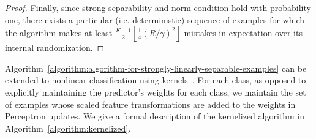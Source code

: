 \begin{proof}


Finally, since strong separability and norm condition hold with probability one,
there exists a particular (i.e. deterministic) sequence of examples for which
the algorithm makes at least $\frac{K-1}2 \left\lfloor \frac 1 4 (R/\gamma)^2
\right\rfloor$ mistakes in expectation over its internal randomization.
\end{proof}

Algorithm~\ref{algorithm:algorithm-for-strongly-linearly-separable-examples} can
be extended to nonlinear classification using
kernels~\cite{Scholkopf-Smola-2002, Shawe-Taylor-Cristianini-2004}. For each
class, as opposed to explicitly maintaining the predictor's weights for each
class, we maintain the set of examples whose scaled feature transformations are
added to the weights in Perceptron updates. We give a formal description of the
kernelized algorithm in Algorithm~\ref{algorithm:kernelized}.

